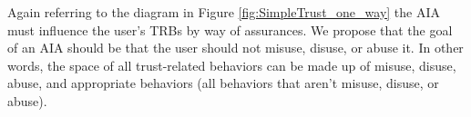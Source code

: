     Again referring to the diagram in Figure \ref{fig:SimpleTrust_one_way} the AIA must influence the user's TRBs by way of assurances. We propose that the goal of an AIA should be that the user should not misuse, disuse, or abuse it. In other words, the space of all trust-related behaviors can be made up of misuse, disuse, abuse, and appropriate behaviors (all behaviors that aren't misuse, disuse, or abuse).

    
    
